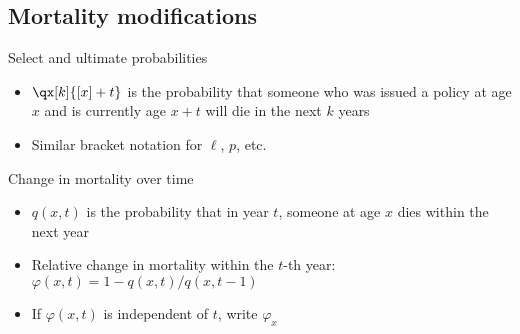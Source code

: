 \subsection{Mortality modifications}

Select and ultimate probabilities
\begin{itemize}
\item $\qx[k]{[x]+t}$ is the probability that someone who was issued a policy at age $x$ and is currently age $x + t$ will die in the next $k$ years
\item Similar bracket notation for $\ell$, $p$, etc.
\end{itemize}

Change in mortality over time
\begin{itemize}
\item $q(x,t)$ is the probability that in year $t$, someone at age $x$ dies within the next year
\item Relative change in mortality within the $t$-th year: $\varphi(x,t) = 1 - q(x,t)/q(x, t - 1)$
\item If $\varphi(x,t)$ is independent of $t$, write $\varphi_x$
\end{itemize}